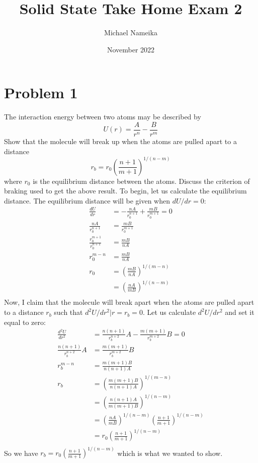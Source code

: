 \documentclass{article}
\title{Solid State Take Home Exam 2}
\author{Michael Nameika}
\date{November 2022}
\begin{document}
\maketitle

\section*{Problem 1}
The interaction energy between two atoms may be described by 
\[U(r) = \frac{A}{r^n} - \frac{B}{r^m}\]
Show that the molecule will break up when the atoms are pulled apart to a distance
\[r_b = r_0\left(\frac{n+1}{m+1}\right)^{1/(n-m)}\]
where $r_0$ is the equilibrium distance between the atoms. Discuss the criterion of braking used to get the above result.
\newline\newline
To begin, let us calculate the equilibrium distance. The equilibrium distance will be given when $dU/dr = 0$: 
\begin{align*}
    \frac{dU}{dr} &= -\frac{nA}{r_0^{n+1}} + \frac{mB}{r_0^{m+1}} = 0\\
    \frac{nA}{r_0^{n+1}} &= \frac{mB}{r_0^{m+1}} \\
    \frac{r_0^{m+1}}{r_0^{n+1}} &= \frac{mB}{nA} \\
    r_0^{m - n} &= \frac{mB}{nA} \\
    r_0 &= \left(\frac{mB}{nA}\right)^{1/(m-n)} \\
    &= \left(\frac{nA}{mB}\right)^{1/(n-m)} \\
\end{align*}
Now, I claim that the molecule will break apart when the atoms are pulled apart to a distance $r_b$ such that $d^2U/dr^2|r = r_b = 0$. Let us calculate $d^2U/dr^2$ and set it equal to zero:
\begin{align*}
    \frac{d^2U}{dr^2} &= \frac{n(n+1)}{r_b^{n+2}}A - \frac{m(m+1)}{r_b^{m+2}}B = 0 \\
    \frac{n(n+1)}{r_b^{n+2}}A &= \frac{m(m+1)}{r_b^{m+2}}B \\
    r_b^{m-n} &= \frac{m(m+1)B}{n(n+1)A} \\
    r_b &= \left(\frac{m(m+1)B}{n(n+1)A}\right)^{1/(m-n)} \\
    &= \left(\frac{n(n+1)A}{m(m+1)B}\right)^{1/(n-m)} \\
    &= \left(\frac{nA}{mB}\right)^{1/(n-m)}\left(\frac{n+1}{m+1}\right)^{1/(n-m)} \\
    &= r_0\left(\frac{n+1}{m+1}\right)^{1/(n-m)} \\
\end{align*}
So we have $r_b = r_0\left(\frac{n+1}{m+1}\right)^{1/(n-m)}$ which is what we wanted to show. 
\end{document}
